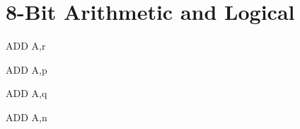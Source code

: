\section{8-Bit Arithmetic and Logical}

\begin{minipage}{\textwidth}

\begin{instrtable}

    \begin{instruction}{ADD A,r}
            \FlagsADDr
    \end{instruction}

    \begin{instruction}{ADD A,p}
            \FlagsADDr
        \SkipToOpCode
            \Cycles{}{}
    \end{instruction}

    \begin{instruction}{ADD A,q} 
            \FlagsADDr
        \SkipToOpCode
    \end{instruction}

    \begin{instruction}{ADD A,n}
            \FlagsADDr
        \SkipToOpCode
    \end{instruction}


\end{instrtable}
\end{minipage}
